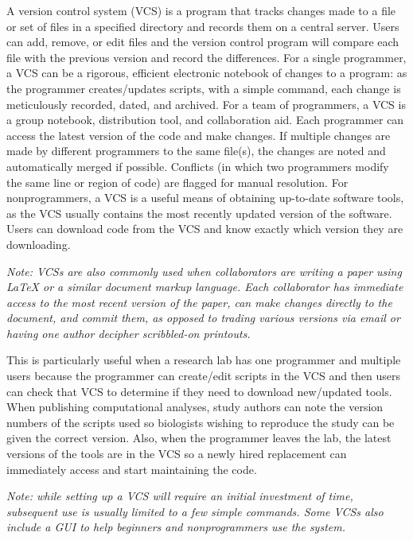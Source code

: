 \documentclass[ChapterTOCs,krantz2]{krantz} %
\begin{document}
A version control system
(VCS) is a program that tracks changes made to a file or set of files in a specified
directory and records them on a central server. Users can add, remove,
or edit files and the version control program will compare each file
with the previous version and record the differences. For a single programmer,
a VCS can be a rigorous, efficient electronic notebook of changes to a program:  
as the programmer
creates/updates scripts, with a simple command, each change is meticulously
recorded, dated, and archived.  For a team of programmers, a VCS
is a group notebook, distribution tool, and collaboration aid.  Each programmer can access the
latest version of the code and make changes.  If multiple changes are made by
different programmers to the same file(s), the changes are noted and automatically
merged if possible. Conflicts (in which two
programmers modify the same line or region of code) are flagged for manual resolution.  
For nonprogrammers, a VCS is a
useful means of obtaining up-to-date software tools, as the VCS usually contains the most 
recently updated version of the software.  Users can download code
from the VCS and know exactly which version they are downloading.

\textsl{Note: VCSs are also commonly used when collaborators are writing 
a paper using LaTeX or a similar document markup language.  Each collaborator 
has immediate access to the most recent version of the paper, can make 
changes directly to the document, and commit them, as opposed 
to trading various versions via email or having one author decipher scribbled-on 
printouts.}

This is particularly useful when a research lab has one programmer 
and multiple users because the programmer can create/edit scripts in
the VCS and then users can check that VCS to determine if they need to
download new/updated tools.  When publishing 
computational analyses, study
authors can note the version numbers of the scripts used so biologists
wishing to reproduce the study can be given the correct version.
Also, when the programmer leaves the lab, the latest versions of the
tools are in the VCS so a newly hired replacement can immediately
access and start maintaining the code.

\textsl{Note: while setting up a VCS will require an initial investment of time, 
subsequent use is usually limited to a few simple commands.  Some VCSs
also include a GUI to help beginners and nonprogrammers use the system.}
\end{document}
